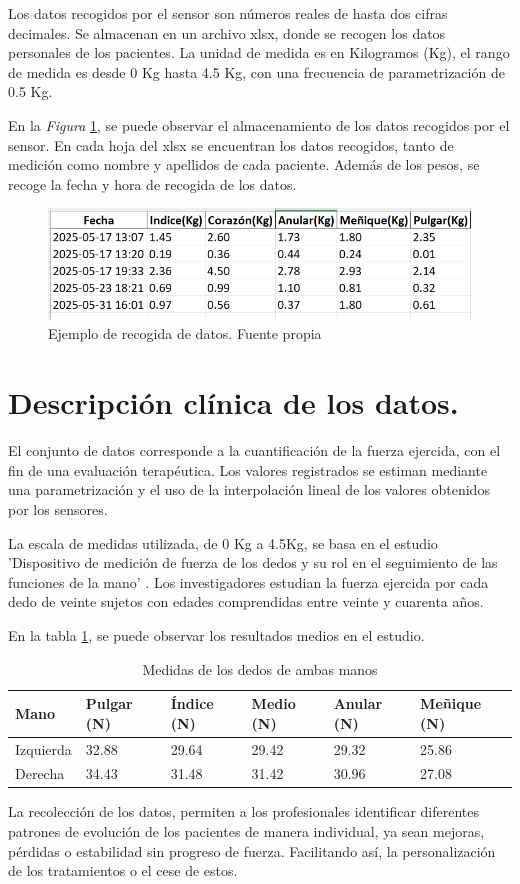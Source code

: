 Los datos recogidos por el sensor son números reales de hasta dos cifras decimales. Se almacenan en un archivo xlsx, donde se recogen los datos personales de los pacientes.
La unidad de medida es en Kilogramos (Kg), el rango de medida es desde 0 Kg hasta 4.5 Kg, con una frecuencia de parametrización de 0.5 Kg.

En la \textit{Figura} \ref{fig:Datosxlsx}, se puede observar el almacenamiento de los datos recogidos por el sensor. En cada hoja del xlsx se encuentran los datos recogidos, tanto de medición como nombre y apellidos de cada paciente. Además de los pesos, se recoge la fecha y hora de recogida de los datos. 
\begin{figure}
    \centering
    \includegraphics[width=0.8\linewidth]{img/Datos.png}
    \caption{Ejemplo de recogida de datos. Fuente propia}
    \label{fig:Datosxlsx}
\end{figure}
\section{Descripción clínica de los datos.}

El conjunto de datos corresponde a la cuantificación de la fuerza ejercida, con el fin de una evaluación terapéutica. Los valores registrados se estiman mediante una parametrización y el uso de la interpolación lineal de los valores obtenidos por los sensores.

La escala de medidas utilizada, de 0 Kg a 4.5Kg, se basa en el estudio 'Dispositivo de medición de fuerza de los dedos y su rol en el seguimiento de las funciones de la mano'  \cite{GOMEZ2022}. Los investigadores estudian la fuerza ejercida por cada dedo de veinte sujetos con edades comprendidas entre veinte y cuarenta años.

En la tabla \ref{tab:medidas_dedos}, se puede observar los resultados medios en el estudio. 

\begin{table}[h]
    \begin{tabular}{|l|l|l|l|l|l|}
\hline
\rowcolor[HTML]{BFBFBF} 
    Mano & Pulgar (N) & Índice (N) & Medio (N) & Anular (N)& Meñique (N) \\ \hline 
    Izquierda & 32.88 & 29.64 & 29.42 & 29.32 & 25.86 \\ \hline
    Derecha & 34.43 & 31.48 & 31.42 & 30.96 & 27.08 \\ \hline
    \end{tabular}
    \caption{Medidas de los dedos de ambas manos}
    \label{tab:medidas_dedos}
\end{table}

La recolección de los datos, permiten a los profesionales identificar diferentes patrones de evolución de los pacientes de manera individual, ya sean mejoras, pérdidas o estabilidad sin progreso de fuerza. Facilitando así, la personalización de los tratamientos o el cese de estos.